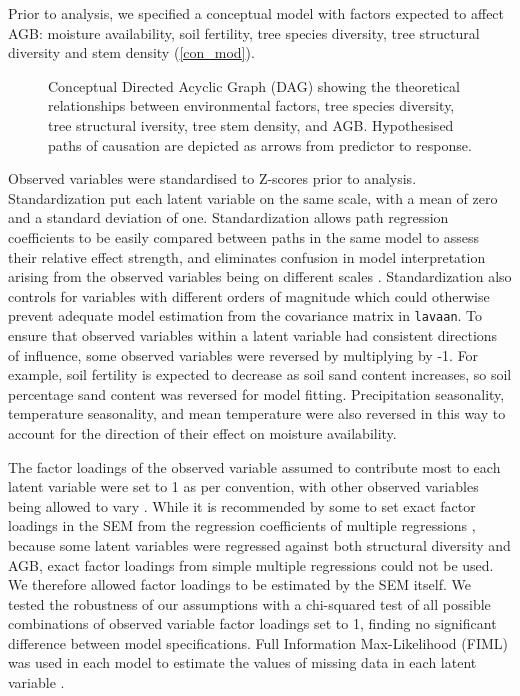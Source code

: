 \documentclass[11pt,a4paper]{article}
\begin{document}
Prior to analysis, we specified a conceptual model with factors expected to affect AGB: moisture availability, soil fertility, tree species diversity, tree structural diversity and stem density (\autoref{con_mod}). 

\begin{figure}[H]
\centering
	
	\caption{Conceptual Directed Acyclic Graph (DAG) showing the theoretical relationships between environmental factors, tree species diversity, tree structural iversity, tree stem density, and AGB. Hypothesised paths of causation are depicted as arrows from predictor to response.}
	\label{con_mod}
\end{figure}

Observed variables were standardised to Z-scores prior to analysis. Standardization put each latent variable on the same scale, with a mean of zero and a standard deviation of one. Standardization allows path regression coefficients to be easily compared between paths in the same model to assess their relative effect strength, and eliminates confusion in model interpretation arising from the observed variables being on different scales \citep{Beaujean2014}. Standardization also controls for variables with different orders of magnitude which could otherwise prevent adequate model estimation from the covariance matrix in \verb|lavaan|. To ensure that observed variables within a latent variable had consistent directions of influence, some observed variables were reversed by multiplying by -1. For example, soil fertility is expected to decrease as soil sand content increases, so soil percentage sand content was reversed for model fitting. Precipitation seasonality, temperature seasonality, and mean temperature were also reversed in this way to account for the direction of their effect on moisture availability.

The factor loadings of the observed variable assumed to contribute most to each latent variable were set to 1 as per convention, with other observed variables being allowed to vary \citep{}. While it is recommended by some to set exact factor loadings in the SEM from the regression coefficients of multiple regressions \citep{}, because some latent variables were regressed against both structural diversity and AGB, exact factor loadings from simple multiple regressions could not be used. We therefore allowed factor loadings to be estimated by the SEM itself. We tested the robustness of our assumptions with a chi-squared test of all possible combinations of observed variable factor loadings set to 1, finding no significant difference between model specifications. Full Information Max-Likelihood (FIML) was used in each model to estimate the values of missing data in each latent variable \citep{Cham2017}.
\end{document}
